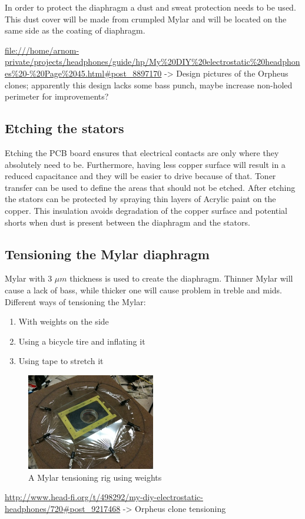 \documentclass{article}
\begin{document}
In order to protect the diaphragm a dust and sweat protection needs to be used. This dust cover will be made from crumpled Mylar and will be located on the same side as the coating of diaphragm.

\url{file:///home/arnom-private/projects/headphones/guide/hp/My\%20DIY\%20electrostatic\%20headphones\%20-\%20Page\%2045.html#post_8897170} -> Design pictures of the Orpheus clones; apparently this design lacks some bass punch, maybe increase non-holed perimeter for improvements?

\subsection{Etching the stators}
\label{s:driver:etching}
Etching the PCB board ensures that electrical contacts are only where they absolutely need to be. Furthermore, having less copper surface will result in a reduced capacitance and they will be easier to drive because of that. Toner transfer can be used to define the areas that should not be etched. After etching the stators can be protected by spraying thin layers of Acrylic paint on the copper. This insulation avoids degradation of the copper surface and potential shorts when dust is present between the diaphragm and the stators.

\subsection{Tensioning the Mylar diaphragm}
\label{s:driver:tension}
Mylar with 3 $\mu m$ thickness is used to create the diaphragm. Thinner Mylar will cause a lack of bass, while thicker one will cause problem in treble and mids.
Different ways of tensioning the Mylar:
\begin{enumerate}
    \item With weights on the side
    \item Using a bicycle tire and inflating it
    \item Using tape to stretch it
\end{enumerate}
\begin{figure}[htb]
    \centering
    \includegraphics[width=0.5\textwidth]{images/mylar-tension-weight.png}
    \caption{A Mylar tensioning rig using weights}
    \label{f:driver:tension:weight}
\end{figure}
\url{http://www.head-fi.org/t/498292/my-diy-electrostatic-headphones/720#post_9217468} -> Orpheus clone tensioning
\end{document}
